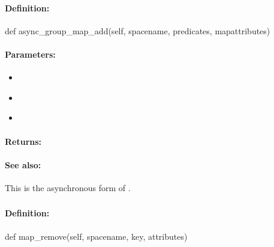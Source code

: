 \paragraph{Definition:}
\begin{pythoncode}
def async_group_map_add(self, spacename, predicates, mapattributes)
\end{pythoncode}

\paragraph{Parameters:}
\begin{itemize}[noitemsep]
\item {}\\

\item {}\\

\item {}\\

\end{itemize}

\paragraph{Returns:}


\paragraph{See also:}  This is the asynchronous form of .

\pagebreak
\subsubsection{}
\label{api:python:map_remove}


\paragraph{Definition:}
\begin{pythoncode}
def map_remove(self, spacename, key, attributes)
\end{pythoncode}

